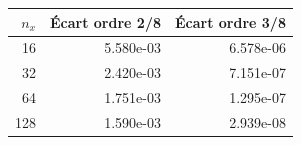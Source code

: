 \begin{tabular}{rrr}
\toprule
$n_x$ & Écart ordre 2/8 & Écart ordre 3/8 \\
\midrule
16 & 5.580e-03 & 6.578e-06 \\
32 & 2.420e-03 & 7.151e-07 \\
64 & 1.751e-03 & 1.295e-07 \\
128 & 1.590e-03 & 2.939e-08 \\
\bottomrule
\end{tabular}
